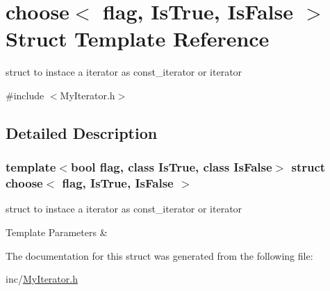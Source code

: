 \hypertarget{structchoose}{}\section{choose$<$ flag, Is\+True, Is\+False $>$ Struct Template Reference}
\label{structchoose}


struct to instace a iterator as const\+\_\+iterator or iterator  




{\ttfamily \#include $<$My\+Iterator.\+h$>$}



\subsection{Detailed Description}
\subsubsection*{template$<$bool flag, class Is\+True, class Is\+False$>$\newline
struct choose$<$ flag, Is\+True, Is\+False $>$}

struct to instace a iterator as const\+\_\+iterator or iterator 


\begin{DoxyTemplParams}{Template Parameters}
{\em } & \\
\hline
\end{DoxyTemplParams}


The documentation for this struct was generated from the following file\+:\begin{DoxyCompactItemize}
\item 
inc/\hyperlink{MyIterator_8h}{My\+Iterator.\+h}\end{DoxyCompactItemize}
